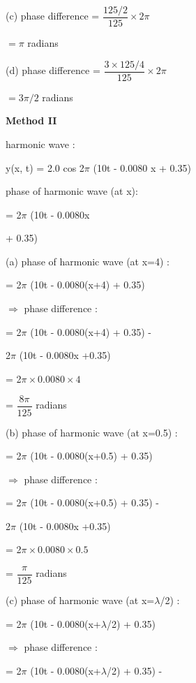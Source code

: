 \documentclass[journal,12pt,twocolumn]{IEEEtran}
\theoremstyle{remark}
\begin{document}
(c) phase difference = $\dfrac{125/2}{125} \times 2\pi$

\begin{center}
$ = \pi$ radians
\end{center}

(d) phase difference = $\dfrac{3 \times 125/4}{125} \times 2\pi$

\begin{center}
$ = 3\pi /2$ radians
\end{center}

\textbf{Method II}

harmonic wave :

y(x, t) = 2.0 cos 2$\pi$ (10t - 0.0080 x + 0.35)

phase of harmonic wave (at x):

= 2$\pi$ (10t - 0.0080x     

+ 0.35)

(a) phase of harmonic wave (at x=4) :

= 2$\pi$ (10t - 0.0080(x+4) + 0.35)

$\Rightarrow$  phase difference :

= 2$\pi$ (10t - 0.0080(x+4) + 0.35) -

2$\pi$ (10t - 0.0080x  +0.35)

= 2$\pi \times 0.0080 \times 4$

\vspace{0.2cm}

= $\dfrac{8\pi}{125}$ radians

\vspace{0.5cm}
(b) phase of harmonic wave (at x=0.5) :

= 2$\pi$ (10t - 0.0080(x+0.5) + 0.35)

$\Rightarrow$  phase difference :

= 2$\pi$ (10t - 0.0080(x+0.5) + 0.35) -

2$\pi$ (10t - 0.0080x  +0.35)

= 2$\pi \times 0.0080 \times 0.5$

\vspace{0.2cm}

= $\dfrac{\pi}{125}$ radians

\vspace{0.5cm}
(c) phase of harmonic wave (at x=$\lambda$/2) :

= 2$\pi$ (10t - 0.0080(x+$\lambda$/2) + 0.35)

$\Rightarrow$  phase difference :

= 2$\pi$ (10t - 0.0080(x+$\lambda$/2) + 0.35) -
\end{document}
